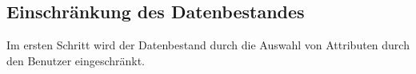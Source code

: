 

\subsection{Einschränkung des Datenbestandes}
Im ersten Schritt wird der Datenbestand durch die Auswahl von Attributen durch den Benutzer eingeschränkt. 


